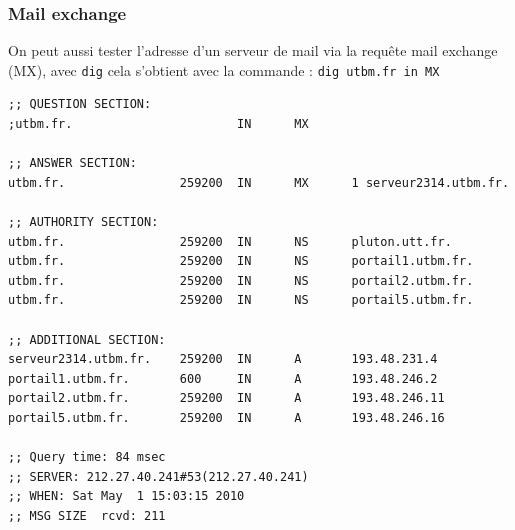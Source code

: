 \documentclass[12pt,a4paper,notitlepage]{article}
\begin{document}
\subsubsection{Mail exchange}
On peut aussi tester l'adresse d'un serveur de mail via la requête mail exchange (MX), avec \texttt{dig} cela s'obtient avec la commande : \texttt{dig utbm.fr in MX}\\
\begin{lstlisting}[title=Contenu d'une requête de type Exchange Mail]
;; QUESTION SECTION:
;utbm.fr.                       IN      MX

;; ANSWER SECTION:
utbm.fr.                259200  IN      MX      1 serveur2314.utbm.fr.

;; AUTHORITY SECTION:
utbm.fr.                259200  IN      NS      pluton.utt.fr.
utbm.fr.                259200  IN      NS      portail1.utbm.fr.
utbm.fr.                259200  IN      NS      portail2.utbm.fr.
utbm.fr.                259200  IN      NS      portail5.utbm.fr.

;; ADDITIONAL SECTION:
serveur2314.utbm.fr.    259200  IN      A       193.48.231.4
portail1.utbm.fr.       600     IN      A       193.48.246.2
portail2.utbm.fr.       259200  IN      A       193.48.246.11
portail5.utbm.fr.       259200  IN      A       193.48.246.16

;; Query time: 84 msec
;; SERVER: 212.27.40.241#53(212.27.40.241)
;; WHEN: Sat May  1 15:03:15 2010
;; MSG SIZE  rcvd: 211
\end{lstlisting}


\clearpage
\end{document}
